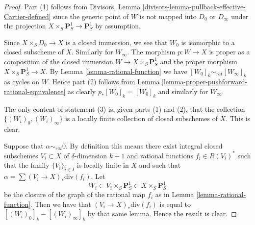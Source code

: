 \documentclass[10pt,a4paper]{amsart}
\theoremstyle{plain}
\theoremstyle{definition}
\theoremstyle{remark}
\numberwithin{equation}{subsection}
\begin{document}
\begin{proof}
Part (1) follows from
Divisors, Lemma \ref{divisors-lemma-pullback-effective-Cartier-defined}
since the generic point
of $W$ is not mapped into $D_0$ or $D_\infty$ under the projection
$X \times_S \mathbf{P}^1_S \to \mathbf{P}^1_S$ by assumption.

\medskip\noindent
Since $X \times_S D_0 \to X$ is a closed immersion, we see that $W_0$
is isomorphic to a closed subscheme of $X$. Similarly for $W_\infty$.
The morphism $p : W \to X$ is proper as a composition of
the closed immersion $W \to X \times_S \mathbf{P}^1_S$ and the
proper morphism $X \times_S \mathbf{P}^1_S \to X$. By
Lemma \ref{lemma-rational-function} we have
$[W_0]_k \sim_{rat} [W_\infty]_k$ as cycles on $W$. Hence part (2) follows from
Lemma \ref{lemma-proper-pushforward-rational-equivalence} as clearly
$p_*[W_0]_k = [W_0]_k$ and similarly for $W_\infty$.

\medskip\noindent
The only content of statement (3) is, given parts (1) and (2), that
the collection $\{(W_i)_0, (W_i)_\infty\}$ is a locally finite collection
of closed subschemes of $X$. This is clear.

\medskip\noindent
Suppose that $\alpha \sim_{rat} 0$.
By definition this means there exist integral closed subschemes
$V_i \subset X$ of $\delta$-dimension $k + 1$ and rational
functions $f_i \in R(V_i)^*$ such that the family
$\{V_i\}_{i \in I}$ is locally finite in $X$ and such that
$\alpha = \sum (V_i \to X)_*\text{div}(f_i)$.
Let
$$
W_i \subset V_i \times_S \mathbf{P}^1_S \subset X \times_S \mathbf{P}^1_S
$$
be the closure of the graph of the rational map $f_i$ as in
Lemma \ref{lemma-rational-function}.
Then we have that $(V_i \to X)_*\text{div}(f_i)$
is equal to $[(W_i)_0]_k - [(W_i)_\infty]_k$ by that same lemma.
Hence the result is clear.
\end{proof}
\end{document}
